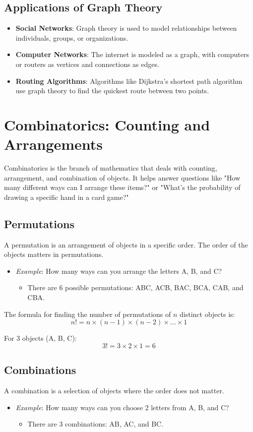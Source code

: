 \subsection{Applications of Graph Theory}
\begin{itemize}
    \item \textbf{Social Networks}: Graph theory is used to model relationships between individuals, groups, or organizations.
    \item \textbf{Computer Networks}: The internet is modeled as a graph, with computers or routers as vertices and connections as edges.
    \item \textbf{Routing Algorithms}: Algorithms like Dijkstra’s shortest path algorithm use graph theory to find the quickest route between two points.
\end{itemize}

\section{Combinatorics: Counting and Arrangements}
Combinatorics is the branch of mathematics that deals with counting, arrangement, and combination of objects. It helps answer questions like "How many different ways can I arrange these items?" or "What’s the probability of drawing a specific hand in a card game?"

\subsection{Permutations}
A permutation is an arrangement of objects in a specific order. The order of the objects matters in permutations.
\begin{itemize}
    \item \textit{Example}: How many ways can you arrange the letters A, B, and C?
    \begin{itemize}
        \item There are 6 possible permutations: ABC, ACB, BAC, BCA, CAB, and CBA.
    \end{itemize}
\end{itemize}

The formula for finding the number of permutations of \( n \) distinct objects is:
\[ n! = n \times (n-1) \times (n-2) \times \dots \times 1 \]

For 3 objects (A, B, C):
\[ 3! = 3 \times 2 \times 1 = 6 \]

\subsection{Combinations}
A combination is a selection of objects where the order does not matter.
\begin{itemize}
    \item \textit{Example}: How many ways can you choose 2 letters from A, B, and C?
    \begin{itemize}
        \item There are 3 combinations: AB, AC, and BC.
    \end{itemize}
\end{itemize}

